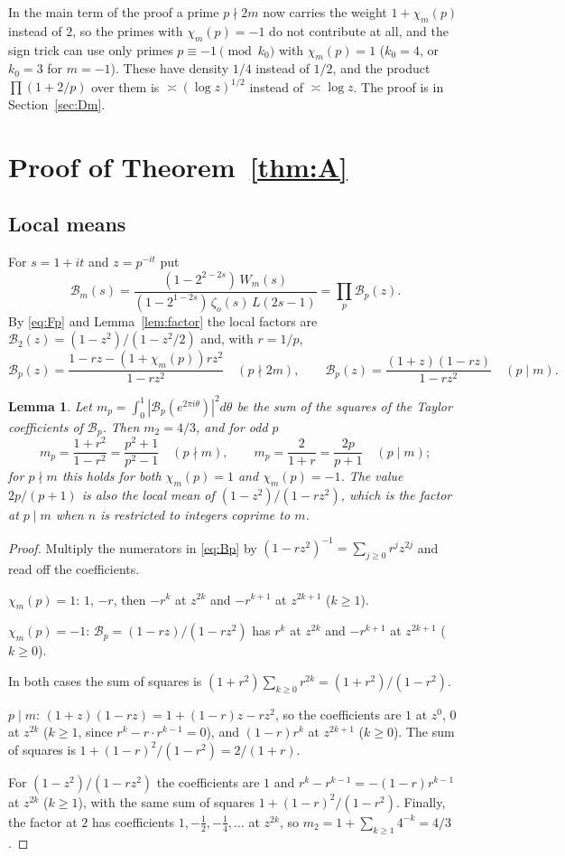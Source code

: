 \documentclass[11pt]{amsart}
\newtheorem{lemma}{Lemma}
\theoremstyle{remark}
\newcommand{\zo}{\zeta_{o}}
\newcommand{\cB}{\mathcal{B}}
\begin{document}
In the main term of the proof a prime $p\nmid2m$ now carries the weight $1+\chi_m(p)$ instead of $2$, so the primes with $\chi_m(p)=-1$ do not contribute at all, and the sign trick can use only primes $p\equiv-1\pmod{k_0}$ with $\chi_m(p)=1$ ($k_0=4$, or $k_0=3$ for $m=-1$). These have density $1/4$ instead of $1/2$, and the product $\prod(1+2/p)$ over them is $\asymp(\log z)^{1/2}$ instead of $\asymp\log z$. The proof is in Section~\ref{sec:Dm}.

\section{Proof of Theorem~\ref{thm:A}}

\subsection{Local means}
For $s=1+it$ and $z=p^{-it}$ put
\[
\cB_m(s)=\frac{(1-2^{2-2s})\,W_m(s)}{(1-2^{1-2s})\,\zo(s)\,L(2s-1)}=\prod_p\cB_p(z).
\]
By \eqref{eq:Fp} and Lemma~\ref{lem:factor} the local factors are $\cB_2(z)=(1-z^2)/(1-z^2/2)$ and, with $r=1/p$,
\begin{equation}\label{eq:Bp}
\cB_p(z)=\frac{1-rz-(1+\chi_m(p))rz^2}{1-rz^2}\quad(p\nmid 2m),\qquad
\cB_p(z)=\frac{(1+z)(1-rz)}{1-rz^2}\quad(p\mid m).
\end{equation}

\begin{lemma}\label{lem:means}
Let $m_p=\int_0^1|\cB_p(e^{2\pi i\theta})|^2d\theta$ be the sum of the squares of the Taylor coefficients of $\cB_p$. Then $m_2=4/3$, and for odd $p$
\[
m_p=\frac{1+r^2}{1-r^2}=\frac{p^2+1}{p^2-1}\quad(p\nmid m),\qquad
m_p=\frac2{1+r}=\frac{2p}{p+1}\quad(p\mid m);
\]
for $p\nmid m$ this holds for both $\chi_m(p)=1$ and $\chi_m(p)=-1$.
The value $2p/(p+1)$ is also the local mean of $(1-z^2)/(1-rz^2)$, which is the factor at $p\mid m$ when $n$ is restricted to integers coprime to $m$.
\end{lemma}

\begin{proof}
Multiply the numerators in \eqref{eq:Bp} by $(1-rz^2)^{-1}=\sum_{j\ge0}r^jz^{2j}$ and read off the coefficients.

$\chi_m(p)=1$: $1$, $-r$, then $-r^k$ at $z^{2k}$ and $-r^{k+1}$ at $z^{2k+1}$ ($k\ge1$).

$\chi_m(p)=-1$: $\cB_p=(1-rz)/(1-rz^2)$ has $r^k$ at $z^{2k}$ and $-r^{k+1}$ at $z^{2k+1}$ ($k\ge0$).

In both cases the sum of squares is $(1+r^2)\sum_{k\ge0}r^{2k}=(1+r^2)/(1-r^2)$.

$p\mid m$: $(1+z)(1-rz)=1+(1-r)z-rz^2$, so the coefficients are $1$ at $z^0$, $0$ at $z^{2k}$ ($k\ge1$, since $r^k-r\cdot r^{k-1}=0$), and $(1-r)r^k$ at $z^{2k+1}$ ($k\ge0$). The sum of squares is $1+(1-r)^2/(1-r^2)=2/(1+r)$.

For $(1-z^2)/(1-rz^2)$ the coefficients are $1$ and $r^k-r^{k-1}=-(1-r)r^{k-1}$ at $z^{2k}$ ($k\ge1$), with the same sum of squares $1+(1-r)^2/(1-r^2)$. Finally, the factor at $2$ has coefficients $1,-\frac12,-\frac14,\dots$ at $z^{2k}$, so $m_2=1+\sum_{k\ge1}4^{-k}=4/3$.
\end{proof}
\end{document}
